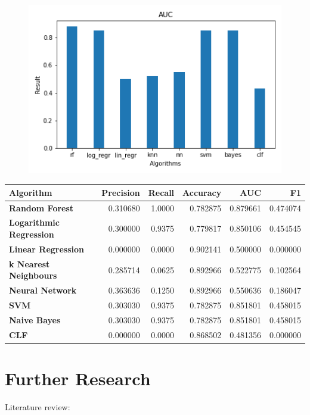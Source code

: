 \documentclass[a4paper,12pt]{report}
\begin{document}
\begin{figure}[H]
    \includegraphics[scale=0.95]{AUC.png}
    \centering
    \label{fig:RF}
\end{figure}

\begin{tabular}{lrrrrr}
    \toprule
        \textbf{Algorithm} &  \textbf{Precision} &  \textbf{Recall} &  \textbf{Accuracy} &       \textbf{AUC} &        \textbf{F1} \\
    \midrule
    \textbf{Random Forest} &   0.310680 &  \cellcolor{lightgray} 1.0000 &  0.782875 &  \cellcolor{lightgray}0.879661 &  \cellcolor{lightgray}0.474074 \\
    \textbf{Logarithmic Regression} &   0.300000 &  0.9375 &  0.779817 &  0.850106 &  0.454545 \\
    \textbf{Linear Regression} &   0.000000 &  0.0000 &  \cellcolor{lightgray}0.902141 &  0.500000 &  0.000000 \\
    \textbf{k Nearest Neighbours} &   0.285714 &  0.0625 &  0.892966 &  0.522775 &  0.102564 \\
    \textbf{Neural Network} &   \cellcolor{lightgray}0.363636 &  0.1250 &  0.892966 &  0.550636 &  0.186047 \\
    \textbf{SVM} &   0.303030 &  0.9375 &  0.782875 &  0.851801 &  0.458015 \\
    \textbf{Naive Bayes} &   0.303030 &  0.9375 &  0.782875 &  0.851801 &  0.458015 \\
    \textbf{CLF} &   0.000000 &  0.0000 &  0.868502 &  0.481356 &  0.000000 \\
    \bottomrule
\end{tabular}
    
\section{Further Research}
Literature review:
\end{document}

